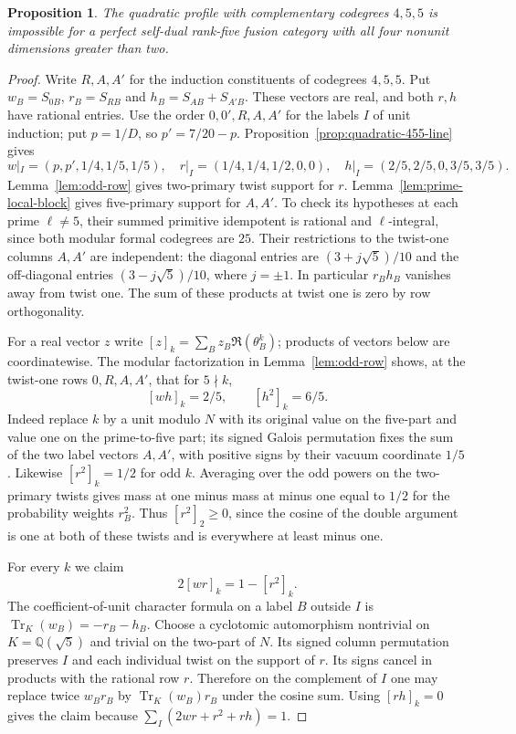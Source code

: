 \documentclass[11pt,a4paper]{article}
\newtheorem{proposition}[theorem]{Proposition}
\numberwithin{equation}{section}
\begin{document}
\begin{proposition}\label{prop:quadratic-455-end}
The quadratic profile with complementary codegrees $4,5,5$ is impossible
for a perfect self-dual rank-five fusion category with all four nonunit
dimensions greater than two.
\end{proposition}
\begin{proof}
Write $R,A,A'$ for the induction constituents of codegrees $4,5,5$.
Put $w_B=S_{0B}$, $r_B=S_{RB}$ and $h_B=S_{AB}+S_{A'B}$.
These vectors are real, and both $r,h$ have rational entries.
Use the order $0,0',R,A,A'$ for the labels $I$ of unit induction;
put $p=1/D$, so $p'=7/20-p$. Proposition~\ref{prop:quadratic-455-line} gives
\[
 w|_I=(p,p',1/4,1/5,1/5),\quad
 r|_I=(1/4,1/4,1/2,0,0),\quad
 h|_I=(2/5,2/5,0,3/5,3/5).
\]
Lemma~\ref{lem:odd-row} gives two-primary twist support for $r$.
Lemma~\ref{lem:prime-local-block} gives five-primary support for
$A,A'$. To check its hypotheses at each prime $\ell\ne5$, their
summed primitive idempotent is rational and $\ell$-integral, since
both modular formal codegrees are $25$. Their restrictions to the
twist-one columns $A,A'$ are independent: the diagonal entries are
$(3+j\sqrt5)/10$ and the off-diagonal entries $(3-j\sqrt5)/10$,
where $j=\pm1$. In particular $r_B h_B$ vanishes away from twist one.
The sum of these products at twist one is zero by row orthogonality.

For a real vector $z$ write $[z]_k=\sum_B z_B\Re(\theta_B^k)$;
products of vectors below are coordinatewise. The modular factorization
in Lemma~\ref{lem:odd-row} shows, at the twist-one rows $0,R,A,A'$,
that for $5\nmid k$,
\[
 [wh]_k=2/5,\qquad [h^2]_k=6/5 .
\]
Indeed replace $k$ by a unit modulo $N$ with its original value on
the five-part and value one on the prime-to-five part; its signed
Galois permutation fixes the sum of the two label vectors $A,A'$,
with positive signs by their vacuum coordinate $1/5$.
Likewise $[r^2]_k=1/2$ for odd $k$. Averaging over the odd powers
on the two-primary twists gives mass at one minus mass at minus one
equal to $1/2$ for the probability weights $r_B^2$.
Thus $[r^2]_2\ge0$, since the cosine of the double argument is one
at both of these twists and is everywhere at least minus one.

For every $k$ we claim
\[
             2[wr]_k=1-[r^2]_k .
\]
The coefficient-of-unit character formula on a label $B$ outside $I$
is $\operatorname{Tr}_K(w_B)=-r_B-h_B$. Choose a cyclotomic
automorphism nontrivial on $K=\mathbb Q(\sqrt5)$ and trivial on the
two-part of $N$. Its signed column permutation preserves $I$ and
each individual twist on the support of $r$. Its signs cancel
in products with the rational row $r$. Therefore on the complement
of $I$ one may replace twice $w_B r_B$ by
$\operatorname{Tr}_K(w_B)r_B$ under the cosine sum. Using
$[rh]_k=0$ gives the claim because
$\sum_I (2wr+r^2+rh)=1$.


\end{proof}
\end{document}
